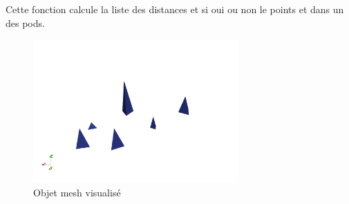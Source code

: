 \documentclass[french]{article}
\begin{document}
Cette fonction calcule la liste des distances et si oui ou non le points et dans un des pods.

\begin{figure}[h]
	\centering
	\includegraphics[width=0.7\textwidth]{Figures/Deffensezone.png}
	\caption{Objet mesh visualisé}
\end{figure}
\end{document}
